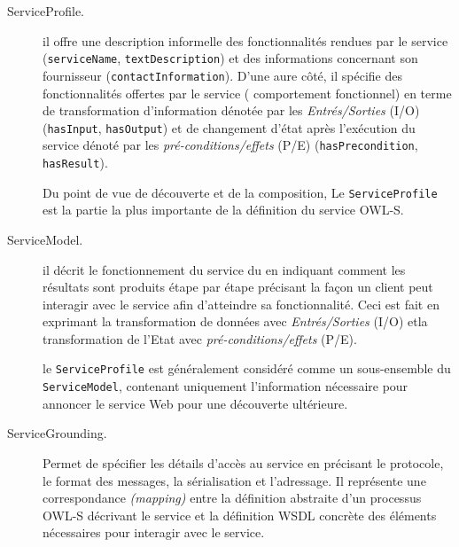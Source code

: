     \SpecialItem
    \renewcommand{\descriptionlabel}[1]{\hspace{1cm}\texttt{#1}}
    \begin{description}
    \item[ServiceProfile.] il offre une description informelle des
      fonctionnalités rendues par le service (\verb|serviceName|,
      \verb|textDescription|) et des informations concernant son
      fournisseur (\verb|contactInformation|). D'une aure côté, il
      spécifie des fonctionnalités offertes par le service (
      comportement fonctionnel) en terme de transformation
      d'information dénotée par les \textit{Entrés/Sorties}
      \textsc{(I/O)} (\verb|hasInput|, \verb|hasOutput|) et de
      changement d'état après l'exécution du service dénoté par les
      \textit{pré-conditions/effets} \textsc{(P/E)}
      (\verb|hasPrecondition|, \verb|hasResult|).

      Du point de vue de découverte et de la composition, Le
      \verb|ServiceProfile| est la partie la plus importante de la
      définition du service \textsc{OWL-S}.

    \item[ServiceModel.] il décrit le fonctionnement du service du en
      indiquant comment les résultats sont produits étape par étape
      précisant la façon un client peut interagir avec le service afin
      d'atteindre sa fonctionnalité. Ceci est fait en exprimant la
      transformation de données avec \textit{Entrés/Sorties}
      \textsc{(I/O)} etla transformation de l'Etat avec
      \textit{pré-conditions/effets} \textsc{(P/E)}.

      le \verb|ServiceProfile| est généralement considéré comme un
      sous-ensemble du \verb|ServiceModel|, contenant uniquement
      l'information nécessaire pour annoncer le service Web pour une
      découverte ultérieure.

    \item[ServiceGrounding.] Permet de spécifier les détails d'accès
      au service en précisant le protocole, le format des messages, la
      sérialisation et l'adressage. Il représente une correspondance
      \textit{(mapping)} entre la définition abstraite d'un processus
      \textsc{OWL-S} décrivant le service et la définition
      \textsc{WSDL} concrète des éléments nécessaires pour interagir
      avec le service.

    \end{description}
    \enddescription

